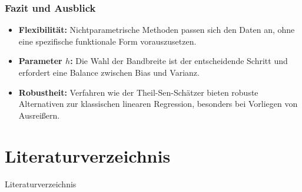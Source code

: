 \documentclass{beamer}
\begin{document}
	\begin{frame}
		\frametitle{Fazit und Ausblick}
		
		\begin{itemize}
			\itemsep10pt
			\item \textbf{Flexibilität:} Nichtparametrische Methoden passen sich den Daten an, ohne eine spezifische funktionale Form vorauszusetzen.
			\item \textbf{Parameter $h$:} Die Wahl der Bandbreite ist der entscheidende Schritt und erfordert eine Balance zwischen Bias und Varianz.
			\item \textbf{Robustheit:} Verfahren wie der Theil-Sen-Schätzer bieten robuste Alternativen zur klassischen linearen Regression, besonders bei Vorliegen von Ausreißern.
		\end{itemize}
	\end{frame}
	
	\section*{Literaturverzeichnis}
	
	\begin{frame}[allowframebreaks]{Literaturverzeichnis}
		\printbibliography
	\end{frame}
	
\end{document}
